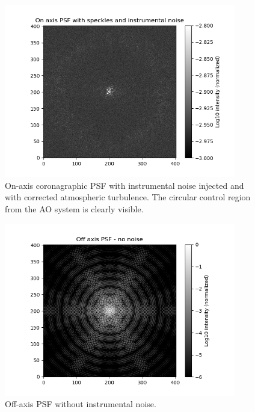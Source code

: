 \begin{figure}[!ht]
  \centering
  \includegraphics[width=0.9\textwidth]{./figures/onaxis_psf.png}
  \caption[On-axis coronagraphic PSF with instrumental noise and corrected turbulence]{%
    On-axis coronagraphic PSF with instrumental noise injected and with corrected atmospheric turbulence.
    The circular control region from the AO system is clearly visible.
  }
  \label{fig:adi_1}
\end{figure}
\begin{figure}[!ht]
  \centering
  \includegraphics[width=0.9\textwidth]{./figures/offaxis_psf.png}
  \caption{Off-axis PSF without instrumental noise.}
  \label{fig:adi_2}
\end{figure}

